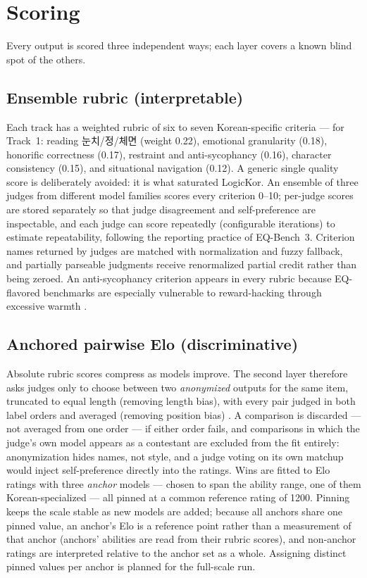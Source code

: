\documentclass[11pt]{article}
\newcommand{\ko}[1]{#1}
\begin{document}
\section{Scoring}
\label{sec:scoring}

Every output is scored three independent ways; each layer covers a known
blind spot of the others.

\subsection{Ensemble rubric (interpretable)}

Each track has a weighted rubric of six to seven Korean-specific criteria
--- for Track~1: reading \ko{눈치}/\ko{정}/\ko{체면} (weight 0.22),
emotional granularity (0.18), honorific correctness (0.17), restraint and
anti-sycophancy (0.16), character consistency (0.15), and situational
navigation (0.12). A generic single quality score is deliberately avoided:
it is what saturated LogicKor. An ensemble of three judges from different
model families scores every criterion 0--10; per-judge scores are stored
separately so that judge disagreement and self-preference are inspectable,
and each judge can score repeatedly (configurable iterations) to estimate
repeatability, following the reporting practice of EQ-Bench~3. Criterion
names returned by judges are matched with normalization and fuzzy
fallback, and partially parseable judgments receive renormalized partial
credit rather than being zeroed. An anti-sycophancy criterion appears in
every rubric because EQ-flavored benchmarks are especially vulnerable to
reward-hacking through excessive warmth \citep{paech2023eqbench}.

\subsection{Anchored pairwise Elo (discriminative)}

Absolute rubric scores compress as models improve. The second layer
therefore asks judges only to choose between two \emph{anonymized} outputs
for the same item, truncated to equal length (removing length bias), with
every pair judged in both label orders and averaged (removing position
bias) \citep{zheng2023judging}. A comparison is discarded --- not
averaged from one order --- if either order fails, and comparisons in
which the judge's own model appears as a contestant are excluded from the
fit entirely: anonymization hides names, not style, and a judge voting on
its own matchup would inject self-preference directly into the ratings.
Wins are fitted to Elo ratings with three \emph{anchor} models --- chosen
to span the ability range, one of them Korean-specialized --- all pinned
at a common reference rating of 1200. Pinning keeps the scale stable as
new models are added; because all anchors share one pinned value, an
anchor's Elo is a reference point rather than a measurement of that
anchor (anchors' abilities are read from their rubric scores), and
non-anchor ratings are interpreted relative to the anchor set as a whole.
Assigning distinct pinned values per anchor is planned for the full-scale
run.
\end{document}

